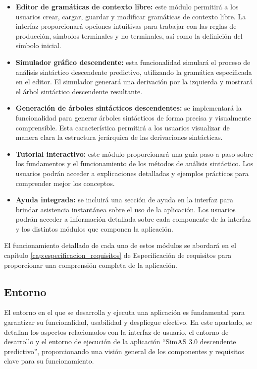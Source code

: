 \begin{itemize}
    \item \textbf{Editor de gramáticas de contexto libre:} este módulo permitirá a los usuarios crear, cargar, guardar y modificar gramáticas de contexto libre. La interfaz proporcionará opciones intuitivas para trabajar con las reglas de producción, símbolos terminales y no terminales, así como la definición del símbolo inicial.

    \item \textbf{Simulador gráfico descendente:} esta funcionalidad simulará el proceso de análisis sintáctico descendente predictivo, utilizando la gramática especificada en el editor. El simulador generará una derivación por la izquierda y mostrará el árbol sintáctico descendente resultante.

    \item \textbf{Generación de árboles sintácticos descendentes:} se implementará la funcionalidad para generar árboles sintácticos de forma precisa y visualmente comprensible. Esta característica permitirá a los usuarios visualizar de manera clara la estructura jerárquica de las derivaciones sintácticas.
    
    \item \textbf{Tutorial interactivo:} este módulo proporcionará una guía paso a paso sobre los fundamentos y el funcionamiento de los métodos de análisis sintáctico. Los usuarios podrán acceder a explicaciones detalladas y ejemplos prácticos para comprender mejor los conceptos.
    
    \item \textbf{Ayuda integrada:} se incluirá una sección de ayuda en la interfaz para brindar asistencia instantánea sobre el uso de la aplicación. Los usuarios podrán acceder a información detallada sobre cada componente de la interfaz y los distintos módulos que componen la aplicación.
\end{itemize}

El funcionamiento detallado de cada uno de estos módulos se abordará en el capítulo \ref{cap:especificacion_requisitos} de Especificación de requisitos para proporcionar una comprensión completa de la aplicación.


\subsection{Entorno}

El entorno en el que se desarrolla y ejecuta una aplicación es fundamental para garantizar su funcionalidad, usabilidad y despliegue efectivo. En este apartado, se detallan los aspectos relacionados con la interfaz de usuario, el entorno de desarrollo y el entorno de ejecución de la aplicación ``SimAS 3.0 descendente predictivo'', proporcionando una visión general de los componentes y requisitos clave para su funcionamiento.


